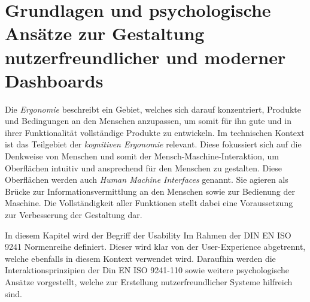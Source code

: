 \section{Grundlagen und psychologische Ansätze zur Gestaltung nutzerfreundlicher und moderner Dash\-boards}
\label{ch:SdF:UI}

Die \textit{Ergonomie} beschreibt ein Gebiet, welches sich darauf konzentriert, Produkte und Bedingungen an den Menschen anzupassen, um somit für ihn gute und in ihrer Funktionalität vollständige Produkte zu entwickeln. Im technischen Kontext ist das Teilgebiet der \textit{kognitiven Ergonomie} relevant. Diese fokussiert sich auf die Denkweise von Menschen und somit der Mensch-Maschine-Interaktion, um Oberflächen intuitiv und ansprechend für den Menschen zu gestalten. Diese Oberflächen werden auch \textit{Human Machine Interfaces} genannt. Sie agieren als Brücke zur Informationsvermittlung an den Menschen sowie zur Bedienung der Maschine. Die Vollständigkeit aller Funktionen stellt dabei eine Voraussetzung zur Verbesserung der Gestaltung dar. \cite[S. 14\psq, 24\psq]{Vollrath:2015:Taschenbuch}

In diesem Kapitel wird der Begriff der Usability Im Rahmen der DIN EN ISO 9241 Normenreihe definiert. Dieser wird klar von der User-Experience abgetrennt, welche ebenfalls in diesem Kontext verwendet wird. Daraufhin werden die Interaktionsprinzipien der Din EN ISO 9241-110 sowie weitere psychologische Ansätze vorgestellt, welche zur Erstellung nutzerfreundlicher Systeme hilfreich sind. 








